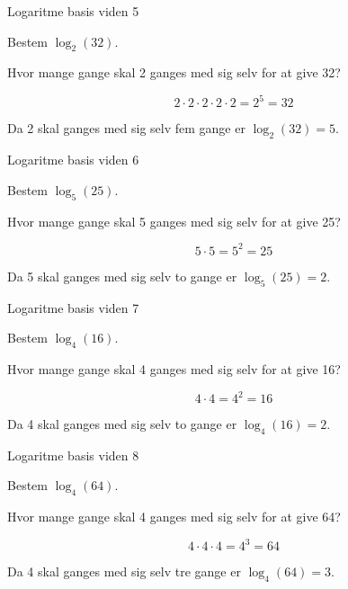 \documentclass{article}
\begin{document}
\newpage


\begin{exercise}{Logaritme basis viden 5}

Bestem $\log_{2}(32)$.


\hint
Hvor mange gange skal 2 ganges med sig selv for at give 32?

\hint
\[
2 \cdot 2 \cdot 2 \cdot 2 \cdot 2 = 2^5 = 32
\]

\hint
Da 2 skal ganges med sig selv fem gange er 
$\log_2(32) = 5$.

\end{exercise}

\newpage


\begin{exercise}{Logaritme basis viden 6}

Bestem $\log_{5}(25)$.


\hint
Hvor mange gange skal 5 ganges med sig selv for at give 25?

\hint
\[
5 \cdot 5 = 5^2 = 25
\]

\hint
Da 5 skal ganges med sig selv to gange er 
$\log_5(25) = 2$.

\end{exercise}

\newpage


\begin{exercise}{Logaritme basis viden 7}

Bestem $\log_{4}(16)$.


\hint
Hvor mange gange skal 4 ganges med sig selv for at give 16?

\hint
\[
4 \cdot 4 = 4^2 = 16
\]

\hint
Da 4 skal ganges med sig selv to gange er 
$\log_4(16) = 2$.

\end{exercise}

\newpage


\begin{exercise}{Logaritme basis viden 8}

Bestem $\log_{4}(64)$.


\hint
Hvor mange gange skal 4 ganges med sig selv for at give 64?

\hint
\[
4 \cdot 4 \cdot 4 = 4^3 = 64
\]

\hint
Da 4 skal ganges med sig selv tre gange er 
$\log_4(64) = 3$.

\end{exercise}
\end{document}
